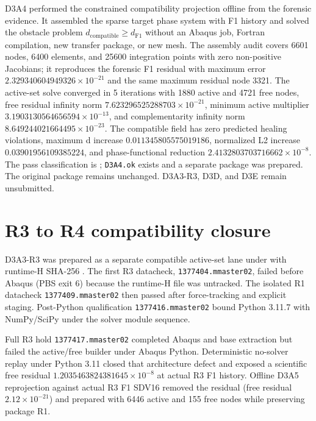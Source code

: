 \documentclass[11pt,a4paper]{article}
\begin{document}
D3A4 performed the constrained compatibility projection offline from the
forensic evidence. It assembled the sparse target phase system with F1 history
and solved the obstacle problem \(d_\mathrm{compatible}\ge d_\mathrm{F1}\)
without an Abaqus job, Fortran compilation, new transfer package, or new mesh.
The assembly audit covers 6601 nodes, 6400 elements, and 25600 integration
points with zero non-positive Jacobians; it reproduces the forensic F1 residual
with maximum error $2.329340604949326\times10^{-21}$ and the same maximum
residual node 3321. The active-set solve converged in 5 iterations with 1880
active and 4721 free nodes, free residual infinity norm
$7.623296525288703\times10^{-21}$, minimum active multiplier
$3.1903130564656594\times10^{-13}$, and complementarity infinity norm
$8.649244021664495\times10^{-23}$. The compatible field has zero predicted
healing violations, maximum d increase $0.011345805575019186$, normalized L2
increase $0.03901956109385224$, and phase-functional reduction
$2.4132803703716662\times10^{-8}$. The pass classification is
; \texttt{D3A4.ok}
exists and a separate
 package
was prepared. The original package remains unchanged. D3A3-R3, D3D, and D3E
remain unsubmitted.

\section{R3 to R4 compatibility closure}
D3A3-R3 was prepared as a separate compatible active-set lane under
 with runtime-H SHA-256
.
The first R3 datacheck, \texttt{1377404.mmaster02}, failed before Abaqus
(PBS exit 6) because the runtime-H file was untracked. The isolated R1
datacheck \texttt{1377409.mmaster02} then passed after force-tracking and
explicit staging. Post-Python qualification \texttt{1377416.mmaster02} bound
Python 3.11.7 with NumPy/SciPy under the solver module sequence.

Full R3 hold \texttt{1377417.mmaster02} completed Abaqus and base extraction
but failed the active/free builder under Abaqus Python. Deterministic
no-solver replay under Python 3.11 closed that architecture defect and exposed
a scientific free residual
$1.2035463824381645\times10^{-8}$ at actual R3 F1 history. Offline D3A5
reprojection against actual R3 F1 SDV16 removed the residual (free residual
$2.12\times10^{-21}$) and prepared
 with 6446 active and 155 free nodes while
preserving package R1.
\end{document}
